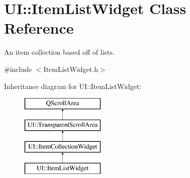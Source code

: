 \hypertarget{class_u_i_1_1_item_list_widget}{\section{U\-I\-:\-:Item\-List\-Widget Class Reference}
\label{class_u_i_1_1_item_list_widget}
}


An item collection based off of lists.  




{\ttfamily \#include $<$Item\-List\-Widget.\-h$>$}

Inheritance diagram for U\-I\-:\-:Item\-List\-Widget\-:\begin{figure}[H]
\begin{center}
\leavevmode
\includegraphics[height=4.000000cm]{class_u_i_1_1_item_list_widget}
\end{center}
\end{figure}
